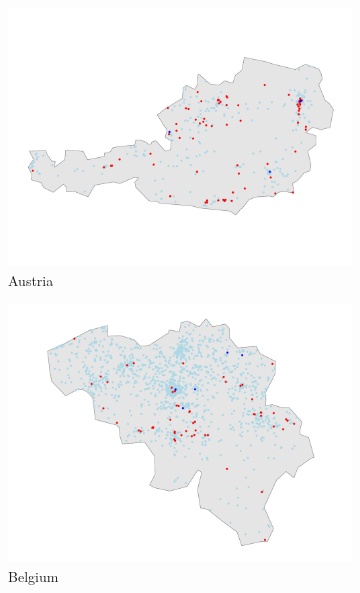 \documentclass[12pt]{report}
\begin{document}
\begin{figure}[ht]
    \centering
    \begin{subfigure}[b]{0.45\textwidth}
        \centering
        \includegraphics[width=\linewidth]{../Output/AT_map.pdf}
        \caption{Austria}
        \label{fig:map_obs_AT}
    \end{subfigure}
    \hfill
    \begin{subfigure}[b]{0.45\textwidth}
        \centering
        \includegraphics[width=\linewidth]{../Output/BE_map.pdf}
        \caption{Belgium}
        \label{fig:map_obs_BE}
    \end{subfigure}
    \vfill
    \begin{subfigure}[b]{0.45\textwidth}

\end{subfigure}
\end{figure}
\end{document}
